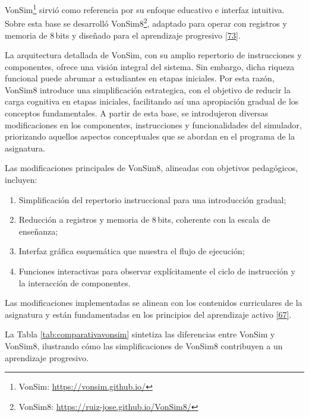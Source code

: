 \documentclass[12pt,oneside]{templates/unerthesis}
\begin{document}
VonSim\footnote{VonSim: \url{https://vonsim.github.io/}} sirvió como referencia por su enfoque educativo e interfaz intuitiva. Sobre esta base se desarrolló VonSim8\footnote{VonSim8: \url{https://ruiz-jose.github.io/VonSim8/}}, adaptado para operar con registros y memoria de 8\,bits y diseñado para el aprendizaje progresivo \protect\hyperlink{ref-vonsim}{{[}73{]}}.

La arquitectura detallada de VonSim, con su amplio repertorio de instrucciones y componentes, ofrece una visión integral del sistema. Sin embargo, dicha riqueza funcional puede abrumar a estudiantes en etapas iniciales. Por esta razón, VonSim8 introduce una simplificación estrategica, con el objetivo de reducir la carga cognitiva en etapas iniciales, facilitando así una apropiación gradual de los conceptos fundamentales. A partir de esta base, se introdujeron diversas modificaciones en los componentes, instrucciones y funcionalidades del simulador, priorizando aquellos aspectos conceptuales que se abordan en el programa de la asignatura.

Las modificaciones principales de VonSim8, alineadas con objetivos pedagógicos, incluyen:

\begin{enumerate}
\def\labelenumi{\arabic{enumi}.}
\item
  Simplificación del repertorio instruccional para una introducción gradual;
\item
  Reducción a registros y memoria de 8\,bits, coherente con la escala de enseñanza;
\item
  Interfaz gráfica esquemática que muestra el flujo de ejecución;
\item
  Funciones interactivas para observar explícitamente el ciclo de instrucción y la interacción de componentes.
\end{enumerate}

Las modificaciones implementadas se alinean con los contenidos curriculares de la asignatura y están fundamentadas en los principios del aprendizaje activo \protect\hyperlink{ref-bonwell1991active}{{[}67{]}}.

La Tabla \ref{tab:comparativavonsim} sintetiza las diferencias entre VonSim y VonSim8, ilustrando cómo las simplificaciones de VonSim8 contribuyen a un aprendizaje progresivo.
\end{document}
